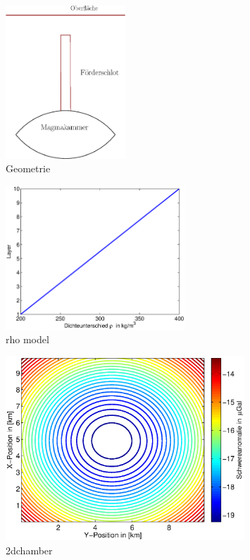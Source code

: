 \documentclass[12pt,a4paper]{scrartcl}
\begin{document}
\begin{figure}[htb]
\centering
\includegraphics[width=0.4\textwidth]{../figures/geometry}
\caption{Geometrie}
\label{geometry}
\end{figure}

\begin{figure}[htb]
\centering
\includegraphics[width=0.6\textwidth]{../figures/rho_model}
\caption{rho model}
\label{rhomodel}
\end{figure}

\begin{figure}[htb]
\centering
\includegraphics[width=0.8\textwidth]{../figures/2dchamber_contour}
\caption{2dchamber}
\label{2dchamber}
\end{figure}
\end{document}

